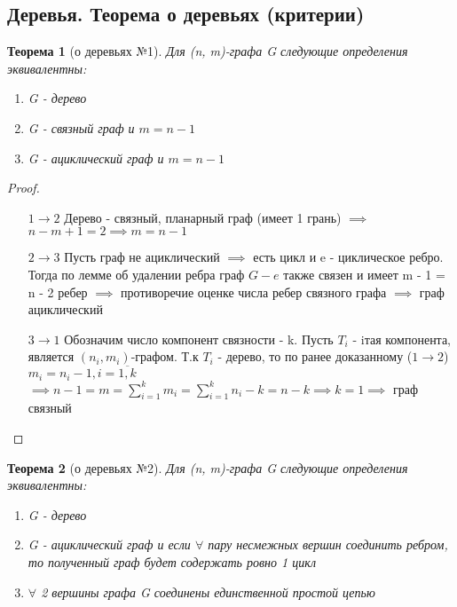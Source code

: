 \documentclass[a4paper]{article}
\newtheorem{theorem}{Теорема}[section]
\theoremstyle{definition}
\theoremstyle{remark}
\begin{document}
\begin{multicols*}{2}
    \section{Деревья. Теорема о деревьях (критерии)}
    \begin{theorem}[о деревьях №1]
        Для (n, m)-графа G следующие определения эквивалентны:
        \begin{enumerate}
            \item G - дерево
            \item G - связный граф и $m = n - 1$
            \item G - ациклический граф и $m = n - 1$
        \end{enumerate}
    \end{theorem}
    \begin{proof}
        \begin{itemize}
            \item[$1 \to 2$] Дерево - связный, планарный граф (имеет 1 грань) $\implies$ $n - m + 1 = 2\implies m = n - 1$
            \item[$2 \to 3$] Пусть граф не ациклический $\implies$ есть цикл и e - циклическое ребро.
            Тогда по лемме об удалении ребра граф $G - e$ также связен и имеет m - 1 = n - 2 ребер
            $\implies$ противоречие оценке числа ребер связного графа $\implies$ граф ациклический
            \item[$3 \to 1$] Обозначим число компонент связности - k. Пусть $T_i$ - iтая компонента,
            является $(n_i, m_i)$-графом. Т.к $T_i$ - дерево, то по ранее доказанному ($1 \to 2$) $m_i = n_i - 1, i = \overline{1, k}$
            $\implies n - 1 = m = \sum_{i = 1}^k m_i = \sum_{i = 1}^k n_i - k = n - k \implies k = 1\implies$ граф связный 
        \end{itemize}
    \end{proof}
    \begin{theorem}[о деревьях №2]
        Для (n, m)-графа G следующие определения эквивалентны:
        \begin{enumerate}
            \item G - дерево
            \item G - ациклический граф и если $\forall$ пару несмежных вершин соединить ребром, то
            полученный граф будет содержать ровно 1 цикл
            \item $\forall$ 2 вершины графа G соединены единственной простой цепью
        \end{enumerate}
    \end{theorem}

\end{multicols*}
\end{document}
